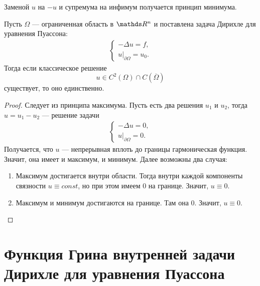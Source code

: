 \begin{note} Заменой $u$ на $-u$ и супремума на инфимум получается принцип минимума.
\end{note}

\begin{corollary} Пусть $\Omega$ --- ограниченная область в $\real^n$ и поставлена задача Дирихле для уравнения Пуассона:
\begin{align*}
	\begin{cases*}
		- \Delta u = f,\\
		u\Big\rvert_{\partial \Omega} = u_0.
	\end{cases*}
\end{align*}
Тогда если классическое решение
$$ u \in C^2(\Omega) \cap C(\overline{\Omega})$$
существует, то оно единственно.
\end{corollary}
\begin{proof}
Следует из принципа максимума. Пусть есть два решения $u_1$ и $u_2$, тогда $u = u_1 - u_2$ --- решение задачи
\begin{align*}
	\begin{cases*}
		- \Delta u = 0,\\
		u\Big\rvert_{\partial \Omega} = 0.
	\end{cases*}
\end{align*}
Получается, что $u$ --- непрерывная вплоть до границы гармоническая функция. Значит, она имеет и максимум, и минимум. Далее возможны два случая:
\begin{enumerate}
\item Максимум достигается внутри области. Тогда внутри каждой компоненты связности $u \equiv const$, но при этом имеем $0$ на границе. Значит, $u \equiv 0$.
\item Максимум и минимум достигаются на границе. Там она $0$. Значит, $u \equiv 0$.
\end{enumerate}
\end{proof}

\section{Функция Грина внутренней задачи Дирихле для уравнения Пуассона}
